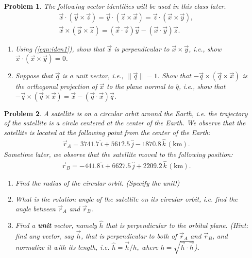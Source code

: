 \documentclass[10pt]{article}
\newcommand{\refeqn}[1]{(\ref{eqn:#1})}
\theoremstyle{plain}\theorembodyfont{\normalfont}
\newtheorem{prob}{Problem}[section]
\newenvironment{subprob}%
{\renewcommand{\theenumi}{\alph{enumi}}\renewcommand{\labelenumi}{(\theenumi)}\begin{enumerate}}%
{\end{enumerate}}%
\begin{document}
\begin{prob}
The following vector identities will be used in this class later.
\begin{gather}
\vec x \cdot (\vec y \times \vec z) =
\vec y \cdot (\vec z \times \vec x) =
\vec z \cdot (\vec x \times \vec y),\label{eqn:iden1}\\
\vec x \times (\vec y \times \vec z) =
(\vec x \cdot \vec z) \vec y - (\vec x\cdot \vec y) \vec z.
\end{gather}
\begin{subprob}
\item Using \refeqn{iden1}, show that $\vec x$ is perpendicular to $\vec x\times \vec y$, i.e., show $\vec x\cdot (\vec x\times \vec y)=0$.
\item Suppose that $\vec q$ is a unit vector, i.e., $\|\vec q\|=1$. Show that $- \vec q \times (\vec q \times \vec x)$ is the orthogonal projection of $\vec x$ to the plane normal to $\hat q$, i.e., show that $- \vec q \times (\vec q \times \vec x)=\vec x - (\vec q\cdot \vec x) \vec q$.
\end{subprob}

\end{prob}


\begin{prob}
A satellite is on a circular orbit around the Earth, i.e. the trajectory of the satellite is a circle centered at the center of the Earth. We observe that the satellite is located at the following point from the center of the Earth:
\begin{align*}
\vec r_A = 3741.7\,\hat i +    5612.5\, \hat j  -1870.8\,\hat k\,(\mathrm{km}).
\end{align*}
Sometime later, we observe that the satellite moved to the following position:
\begin{align*}
\vec r_B = -441.8\,\hat i +    6627.5\, \hat j +2209.2\,\hat k\,(\mathrm{km}).
\end{align*}

\begin{subprob}
\item Find the radius of the circular orbit. (Specify the unit!)
\item What is the rotation angle of the satellite on its circular orbit, i.e. find the angle between $\vec r_A$ and $\vec r_B$.
\item Find a \textbf{unit} vector, namely $\hat h$ that is perpendicular to the orbital plane. (Hint: find any vector, say $\vec h$, that is perpendicular to both of $\vec r_A$ and $\vec r_B$, and normalize it with its length, i.e. $\hat h = \vec h / h$, where $h=\sqrt{\vec h \cdot \vec h}$).
\end{subprob}

\end{prob}
\end{document}
